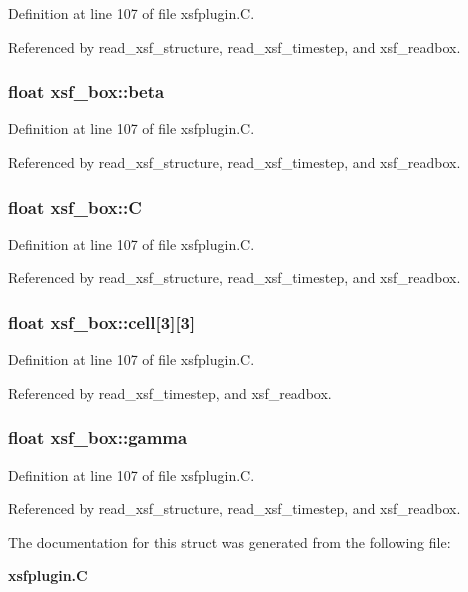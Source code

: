Definition at line 107 of file xsfplugin.C.

Referenced by read\_\-xsf\_\-structure, read\_\-xsf\_\-timestep, and xsf\_\-readbox.
\subsubsection{\setlength{\rightskip}{0pt plus 5cm}float xsf\_\-box::beta}\label{structxsf__box_m4}




Definition at line 107 of file xsfplugin.C.

Referenced by read\_\-xsf\_\-structure, read\_\-xsf\_\-timestep, and xsf\_\-readbox.
\subsubsection{\setlength{\rightskip}{0pt plus 5cm}float xsf\_\-box::C}\label{structxsf__box_m2}




Definition at line 107 of file xsfplugin.C.

Referenced by read\_\-xsf\_\-structure, read\_\-xsf\_\-timestep, and xsf\_\-readbox.
\subsubsection{\setlength{\rightskip}{0pt plus 5cm}float xsf\_\-box::cell[3][3]}\label{structxsf__box_m6}




Definition at line 107 of file xsfplugin.C.

Referenced by read\_\-xsf\_\-timestep, and xsf\_\-readbox.
\subsubsection{\setlength{\rightskip}{0pt plus 5cm}float xsf\_\-box::gamma}\label{structxsf__box_m5}




Definition at line 107 of file xsfplugin.C.

Referenced by read\_\-xsf\_\-structure, read\_\-xsf\_\-timestep, and xsf\_\-readbox.

The documentation for this struct was generated from the following file:\begin{CompactItemize}
\item 
{\bf xsfplugin.C}\end{CompactItemize}
